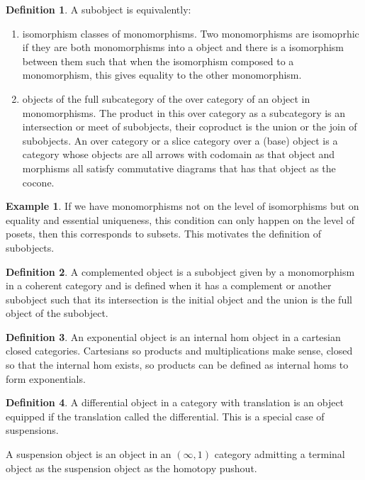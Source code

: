 \documentclass[10pt]{article}
\theoremstyle{plain}%
\theoremstyle{definition}
\newtheorem{definition}{Definition}[section]
\newtheorem{example}{Example}[section]
\theoremstyle{remark}
\begin{document}
\begin{definition}
    A subobject is equivalently:
    \begin{enumerate}
        \item isomorphism classes of monomorphisms. Two monomorphisms are isomoprhic if they are both monomorphisms into a object and there is a isomorphism between them such that when the isomorphism composed to a monomorphism, this gives equality to the other monomorphism.
        \item objects of the full subcategory of the over category of an object in monomorphisms. The product in this over category as a subcategory is an intersection or meet of subobjects, their coproduct is the union or the join of subobjects. An over category or a slice category over a (base) object is a category whose objects are all arrows with codomain as that object and morphisms all satisfy commutative diagrams that has that object as the cocone.
    \end{enumerate}
\end{definition}

\begin{example}
	If we have monomorphisms not on the level of isomorphisms but on equality and essential uniqueness, this condition can only happen on the level of posets, then this corresponds to subsets. This motivates the definition of subobjects.
\end{example}

\begin{definition}
    A complemented object is a subobject given by a monomorphism in a coherent category and is defined when it has a complement or another subobject such that its intersection is the initial object and the union is the full object of the subobject.
\end{definition}

\begin{definition}
    An exponential object is an internal hom object in a cartesian closed categories. Cartesians so products and multiplications make sense, closed so that the internal hom exists, so products can be defined as internal homs to form exponentials.
\end{definition}

\begin{definition}
    A differential object in a category with translation is an object equipped if the translation called the differential. This is a special case of suspensions.

    A suspension object is an object in an $(\infty,1)$ category admitting a terminal object as the suspension object as the homotopy pushout.
\end{definition}
\end{document}
